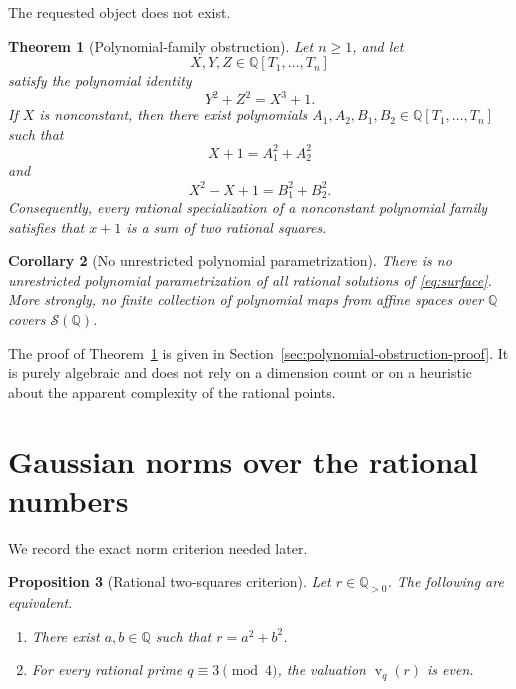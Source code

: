 \documentclass[11pt,a4paper]{article}
\numberwithin{equation}{section}
\newtheorem{theorem}{Theorem}[section]
\newtheorem{proposition}[theorem]{Proposition}
\newtheorem{corollary}[theorem]{Corollary}
\theoremstyle{definition}
\newcommand{\Q}{\mathbb Q}
\newcommand{\vord}{\operatorname v}
\begin{document}
The requested object does not exist.

\begin{theorem}[Polynomial-family obstruction]
\label{thm:polynomial-obstruction}
Let $n\ge1$, and let
\[
 X,Y,Z\in\Q[T_1,\ldots,T_n]
\]
satisfy the polynomial identity
\begin{equation}
 Y^2+Z^2=X^3+1.
 \label{eq:polynomial-identity}
\end{equation}
If $X$ is nonconstant, then there exist polynomials
$A_1,A_2,B_1,B_2\in\Q[T_1,\ldots,T_n]$ such that
\begin{equation}
 X+1=A_1^2+A_2^2
 \label{eq:Xplus1-polynomial-norm}
\end{equation}
and
\begin{equation}
 X^2-X+1=B_1^2+B_2^2.
 \label{eq:quadratic-factor-polynomial-norm}
\end{equation}
Consequently, every rational specialization of a nonconstant polynomial
family satisfies that $x+1$ is a sum of two rational squares.
\end{theorem}

\begin{corollary}[No unrestricted polynomial parametrization]
\label{cor:no-global-polynomial-param}
There is no unrestricted polynomial parametrization of all rational solutions
of \eqref{eq:surface}.  More strongly, no finite collection of polynomial
maps from affine spaces over $\Q$ covers $\mathcal S(\Q)$.
\end{corollary}

The proof of Theorem~\ref{thm:polynomial-obstruction} is given in
Section~\ref{sec:polynomial-obstruction-proof}.  It is purely algebraic and
does not rely on a dimension count or on a heuristic about the apparent
complexity of the rational points.

\section{Gaussian norms over the rational numbers}
\label{sec:gaussian-norms}

We record the exact norm criterion needed later.

\begin{proposition}[Rational two-squares criterion]
\label{prop:rational-two-squares}
Let $r\in\Q_{>0}$.  The following are equivalent.
\begin{enumerate}
\item There exist $a,b\in\Q$ such that $r=a^2+b^2$.
\item For every rational prime $q\equiv3\pmod4$, the valuation
$\vord_q(r)$ is even.
\end{enumerate}
\end{proposition}
\end{document}
